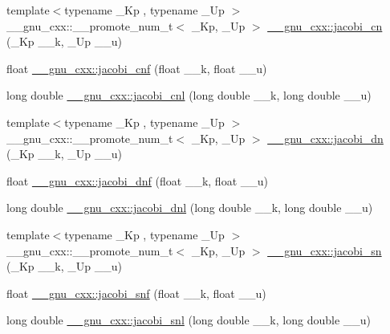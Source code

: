 \begin{DoxyCompactItemize}
\item 
{\footnotesize template$<$typename \+\_\+\+Kp , typename \+\_\+\+Up $>$ }\\\+\_\+\+\_\+gnu\+\_\+cxx\+::\+\_\+\+\_\+promote\+\_\+num\+\_\+t$<$ \+\_\+\+Kp, \+\_\+\+Up $>$ \hyperlink{group__gnu__math__spec__func_gaa49fc22cc0f9dde812bab5147fad23ca}{\+\_\+\+\_\+gnu\+\_\+cxx\+::jacobi\+\_\+cn} (\+\_\+\+Kp \+\_\+\+\_\+k, \+\_\+\+Up \+\_\+\+\_\+u)
\item 
float \hyperlink{group__gnu__math__spec__func_gadbd6320123f45ae10d539cf8df0373cd}{\+\_\+\+\_\+gnu\+\_\+cxx\+::jacobi\+\_\+cnf} (float \+\_\+\+\_\+k, float \+\_\+\+\_\+u)
\item 
long double \hyperlink{group__gnu__math__spec__func_ga08892965ea520116cc53a764513fe685}{\+\_\+\+\_\+gnu\+\_\+cxx\+::jacobi\+\_\+cnl} (long double \+\_\+\+\_\+k, long double \+\_\+\+\_\+u)
\item 
{\footnotesize template$<$typename \+\_\+\+Kp , typename \+\_\+\+Up $>$ }\\\+\_\+\+\_\+gnu\+\_\+cxx\+::\+\_\+\+\_\+promote\+\_\+num\+\_\+t$<$ \+\_\+\+Kp, \+\_\+\+Up $>$ \hyperlink{group__gnu__math__spec__func_ga2be54b9c153b58a85d5ed9f1d0a02e21}{\+\_\+\+\_\+gnu\+\_\+cxx\+::jacobi\+\_\+dn} (\+\_\+\+Kp \+\_\+\+\_\+k, \+\_\+\+Up \+\_\+\+\_\+u)
\item 
float \hyperlink{group__gnu__math__spec__func_gae96327d678adc6b5c4051f1c3649549a}{\+\_\+\+\_\+gnu\+\_\+cxx\+::jacobi\+\_\+dnf} (float \+\_\+\+\_\+k, float \+\_\+\+\_\+u)
\item 
long double \hyperlink{group__gnu__math__spec__func_gae59786991abbf8359deef49b6323065a}{\+\_\+\+\_\+gnu\+\_\+cxx\+::jacobi\+\_\+dnl} (long double \+\_\+\+\_\+k, long double \+\_\+\+\_\+u)
\item 
{\footnotesize template$<$typename \+\_\+\+Kp , typename \+\_\+\+Up $>$ }\\\+\_\+\+\_\+gnu\+\_\+cxx\+::\+\_\+\+\_\+promote\+\_\+num\+\_\+t$<$ \+\_\+\+Kp, \+\_\+\+Up $>$ \hyperlink{group__gnu__math__spec__func_gad7e60d39a8b57a427eb8ca31c8d09e10}{\+\_\+\+\_\+gnu\+\_\+cxx\+::jacobi\+\_\+sn} (\+\_\+\+Kp \+\_\+\+\_\+k, \+\_\+\+Up \+\_\+\+\_\+u)
\item 
float \hyperlink{group__gnu__math__spec__func_ga5981245b7343da6e21d445bb01fdba9c}{\+\_\+\+\_\+gnu\+\_\+cxx\+::jacobi\+\_\+snf} (float \+\_\+\+\_\+k, float \+\_\+\+\_\+u)
\item 
long double \hyperlink{group__gnu__math__spec__func_ga1c13539e3b051a07b1c28aa8a0aeb1b4}{\+\_\+\+\_\+gnu\+\_\+cxx\+::jacobi\+\_\+snl} (long double \+\_\+\+\_\+k, long double \+\_\+\+\_\+u)

\end{DoxyCompactItemize}
